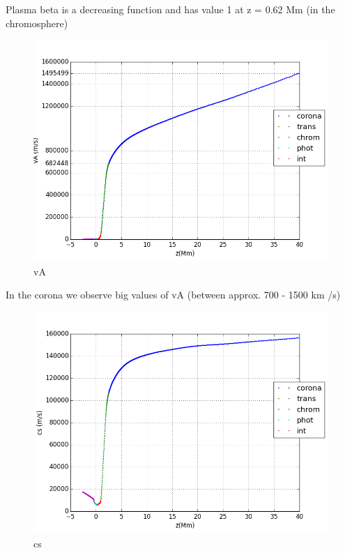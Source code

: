 \documentclass[10pt]{book}
\begin{document}
Plasma beta is a decreasing function and has value 1 at z = 0.62 Mm (in the chromosphere) 

\begin{figure}[H]
 \centering
 \includegraphics[scale=0.5]{fromFile4.png}
 \caption{vA}
\end{figure}

In the corona  we observe big values of vA  (between approx. 700 - 1500 km /s) 

\begin{figure}[H]
 \centering
 \includegraphics[scale=0.5]{fromFile5.png}
 \caption{cs}
\end{figure}
\end{document}
